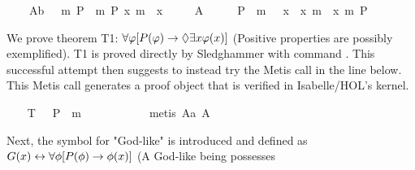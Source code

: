 \begin{isabellebody}
\ \ \ \ A{}b{\isacharcolon}\ {\isachardoublequoteopen}{\isacharbrackleft}{\isasymPi}\ {\isacharparenleft}{\isasymlambda}{\isasymPhi}{\isachardot}\ m{\isasymnot}\ {\isacharparenleft}P\ {\isasymPhi}{\isacharparenright}\ m{\isasymRightarrow}\ P\ {\isacharparenleft}{\isasymlambda}x{\isachardot}\ m{\isasymnot}\ {\isacharparenleft}{\isasymPhi}\ x{\isacharparenright}{\isacharparenright}{\isacharparenright}{\isacharbrackright}{\isachardoublequoteclose}\ \isanewline
\ \ \ \ A{}{\isacharcolon}\ \ {\isachardoublequoteopen}{\isacharbrackleft}{\isasymPi}\ {\isacharparenleft}{\isasymlambda}{\isasymPhi}{\isachardot}\ {\isasymPi}\ {\isacharparenleft}{\isasymlambda}{\isasympsi}{\isachardot}\ {\isacharparenleft}P\ {\isasymPhi}\ m{\isasymand}\ {\isasymbox}\ {\isacharparenleft}{\isasymforall}\ {\isacharparenleft}{\isasymlambda}x{\isachardot}\ {\isasymPhi}\ x\ m{\isasymRightarrow}\ {\isasympsi}\ x{\isacharparenright}{\isacharparenright}{\isacharparenright}\ m{\isasymRightarrow}\ P\ {\isasympsi}{\isacharparenright}{\isacharparenright}{\isacharbrackright}{\isachardoublequoteclose}%
\begin{isamarkuptext}%
We prove theorem T1: $\forall \varphi [P(\varphi) \rightarrow \Diamond \exists x \varphi(x)]$ (Positive 
properties are possibly exemplified). T1 is proved directly by Sledghammer with command . This successful attempt then suggests to 
instead try the Metis call in the line below. This Metis call generates a proof object 
that is verified in Isabelle/HOL's kernel.%
\end{isamarkuptext}%
\isamarkuptrue%
\ \ \isamarkupfalse%
\ T{}{\isacharcolon}\ {\isachardoublequoteopen}{\isacharbrackleft}{\isasymPi}\ {\isacharparenleft}{\isasymlambda}{\isasymPhi}{\isachardot}\ P\ {\isasymPhi}\ m{\isasymRightarrow}\ {\isasymdiamond}\ {\isacharparenleft}{\isasymexists}\ {\isasymPhi}{\isacharparenright}{\isacharparenright}{\isacharbrackright}{\isachardoublequoteclose}\ \ \isanewline
\ \ \isanewline
%
\isadelimproof
\ \ %
\endisadelimproof
%
\isatagproof
{}\isamarkupfalse%
\ {\isacharparenleft}metis\ A{}a\ A{}{\isacharparenright}%
\endisatagproof
{\isafoldproof}%
%
\isadelimproof
%
\endisadelimproof
%
\begin{isamarkuptext}%
Next, the symbol  for "God-like" is introduced and defined 
as $G(x) \leftrightarrow \forall \phi [P(\phi) \to \phi(x)]$ (A God-like being possesses 

\end{isamarkuptext}
\end{isabellebody}
